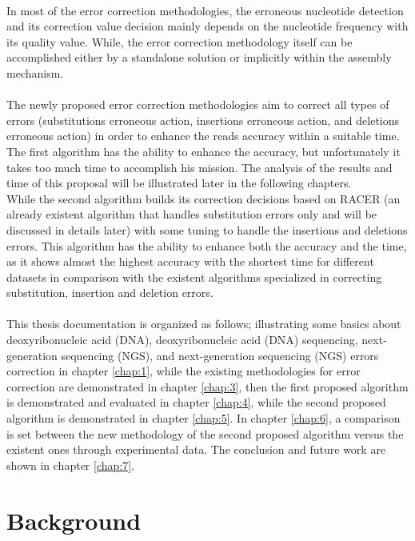 \documentclass[12pt]{llncs}
\begin{document}
\\
In most of the error correction methodologies, the erroneous nucleotide detection and its correction value decision mainly depends on the nucleotide frequency with its quality value\cite{ErrCorr}. While, the error correction methodology itself can be accomplished either by a standalone solution or implicitly within the assembly mechanism. 
\\
\\
The newly proposed error correction methodologies aim to correct all types of errors (substitutions erroneous action, insertions erroneous action, and deletions erroneous action) in order to enhance the reads accuracy within a suitable time. 
\\
The first algorithm has the ability to enhance the accuracy, but unfortunately it takes too much time to accomplish his mission. The analysis of the results and time of this proposal will be illustrated later in the following chapters. 
\\
While the second algorithm builds its correction decisions based on RACER \cite{Racer} (an already existent algorithm that handles substitution errors only and will be discussed in details later) with some tuning to handle the insertions and deletions errors. This algorithm has the ability to enhance both the accuracy and the time, as it shows almost the highest accuracy with the shortest time for different datasets in comparison with the existent algorithms specialized in correcting substitution, insertion and deletion errors.
\\
\\
This thesis documentation is organized as follows; illustrating some basics about deoxyribonucleic acid (DNA), deoxyribonucleic acid (DNA) sequencing, next-generation sequencing (NGS), and next-generation sequencing (NGS) errors correction in chapter \ref{chap:1}, while the  existing methodologies for error correction are demonstrated in chapter \ref{chap:3}, then the first proposed algorithm is demonstrated and evaluated in chapter \ref{chap:4}, while the second proposed algorithm is demonstrated in chapter \ref{chap:5}. In chapter \ref{chap:6}, a comparison is set between the new methodology of the second proposed algorithm versus the existent ones through experimental data. The conclusion and future work are shown in chapter \ref{chap:7}.
%

\chapter{\label{chap:2}Background}
\end{document}
